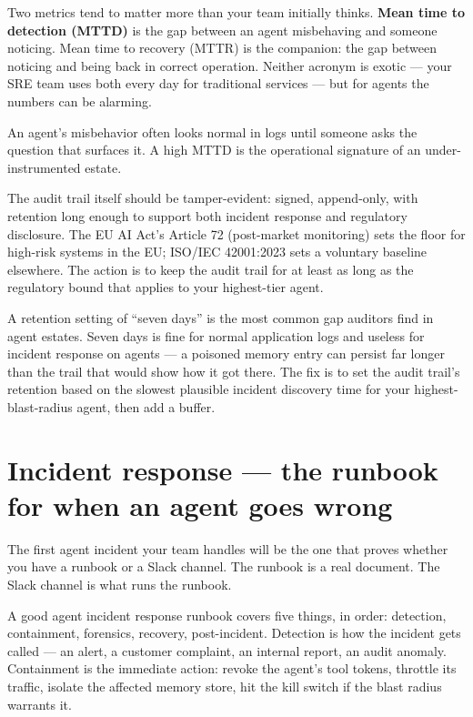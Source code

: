 Two metrics tend to matter more than your team initially thinks. \textbf{Mean time to detection (MTTD)} is the gap between an agent misbehaving and someone noticing. Mean time to recovery (MTTR) is the companion: the gap between noticing and being back in correct operation. Neither acronym is exotic --- your SRE team uses both every day for traditional services --- but for agents the numbers can be alarming.

An agent's misbehavior often looks normal in logs until someone asks the question that surfaces it. A high MTTD is the operational signature of an under-instrumented estate.

The audit trail itself should be tamper-evident: signed, append-only, with retention long enough to support both incident response and regulatory disclosure. The EU AI Act's Article 72 (post-market monitoring) \citep{euAIact2024} sets the floor for high-risk systems in the EU; ISO/IEC 42001:2023 \citep{iso-iec-42001} sets a voluntary baseline elsewhere. The action is to keep the audit trail for at least as long as the regulatory bound that applies to your highest-tier agent.

\begin{TNwarning}
A retention setting of ``seven days'' is the most common gap auditors find in agent estates. Seven days is fine for normal application logs and useless for incident response on agents --- a poisoned memory entry can persist far longer than the trail that would show how it got there. The fix is to set the audit trail's retention based on the slowest plausible incident discovery time for your highest-blast-radius agent, then add a buffer.
\end{TNwarning}

\section{Incident response --- the runbook for when an agent goes wrong}

The first agent incident your team handles will be the one that proves whether you have a runbook or a Slack channel. The runbook is a real document. The Slack channel is what runs the runbook.

A good agent incident response runbook covers five things, in order: detection, containment, forensics, recovery, post-incident. Detection is how the incident gets called --- an alert, a customer complaint, an internal report, an audit anomaly. Containment is the immediate action: revoke the agent's tool tokens, throttle its traffic, isolate the affected memory store, hit the kill switch if the blast radius warrants it.

